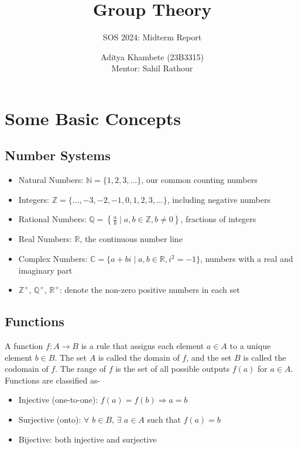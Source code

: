 \documentclass[12pt,a4paper,oneside]{report}
\title{Group Theory}
\subtitle{SOS 2024: Midterm Report}
\author{Aditya Khambete (23B3315)\\Mentor: Sahil Rathour}
\date{}
\theoremstyle{definition}
\begin{document}


\maketitle
\tableofcontents


\chapter{Some Basic Concepts}
\section{Number Systems}
\begin{itemize}
  \item Natural Numbers: $\mathbb{N} = \{1, 2, 3, \ldots\}$, our common counting numbers
  \item Integers: $\mathbb{Z} = \{\ldots, -3, -2, -1, 0, 1, 2, 3, \ldots\}$, including negative numbers
  \item Rational Numbers: $\mathbb{Q} = \left\{\frac{a}{b} \mid a, b \in \mathbb{Z}, b \neq 0\right\}$, fractions of integers
  \item Real Numbers: $\mathbb{R}$, the continuous number line
  \item Complex Numbers: $\mathbb{C} = \{a + bi \mid a, b \in \mathbb{R}, i^2 = -1\}$, numbers with a real and imaginary part
  \item ${\mathbb{Z}}^{+}$, ${\mathbb{Q}}^{+}$, ${\mathbb{R}}^{+}$: denote the non-zero positive numbers in each set
\end{itemize}
\section{Functions}
A function $f: A \rightarrow B$ is a rule that assigns each element $a \in A$ to a unique element $b \in B$. The set $A$ is called the domain of $f$, and the set $B$ is called the codomain of $f$. The range of $f$ is the set of all possible outputs $f(a)$ for $a \in A$.
\\Functions are classified as-
\begin{itemize}
  \item Injective (one-to-one): $f(a) = f(b) \Rightarrow a = b$
  \item Surjective (onto): $\forall$  $b \in B$, $\exists$ $a \in A$ such that $f(a) = b$
  \item Bijective: both injective and surjective
\end{itemize}
\end{document}

